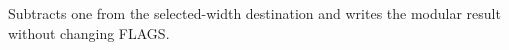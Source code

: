 Subtracts one from the selected-width destination and writes the modular result without changing FLAGS.

